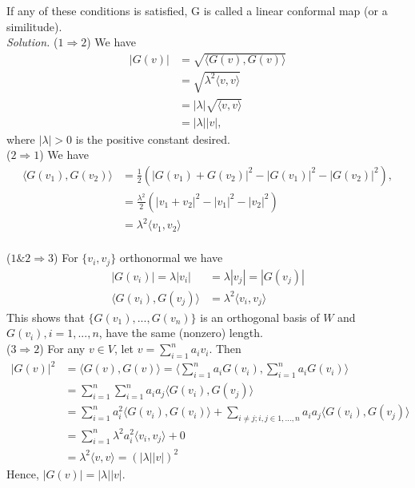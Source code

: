 \documentclass[12pt]{article}
\begin{document}
If any of these conditions is satisfied, G is called a linear conformal map (or a similitude).\\

\textit{Solution.}
($1 \Rightarrow 2$) We have \begin{align*}
    |G(v)| &= \sqrt{\langle G(v), G(v)\rangle}\\
    &= \sqrt{\lambda^2 \langle v, v\rangle}\\
    &= |\lambda|\sqrt{\langle v, v\rangle}\\
    &= |\lambda||v|,
\end{align*}
where $|\lambda| > 0$ is the positive constant desired.\\

($2 \Rightarrow 1$) We have \begin{align*}
    \langle G(v_1), G(v_2)\rangle &= \frac{1}{2}(|G(v_1)+G(v_2)|^2-|G(v_1)|^2-|G(v_2)|^2),\\
    &= \frac{\lambda^2}{2}(|v_1+v_2|^2-|v_1|^2-|v_2|^2)\\
    &= \lambda^2\langle v_1, v_2\rangle\\
\end{align*}

($1\&2 \Rightarrow 3$) For $\{v_i,v_j\}$ orthonormal we have \begin{align*}
    |G(v_i)| = \lambda|v_i| &= \lambda|v_j| = |G(v_j)|\\
    \langle G(v_i), G(v_j)\rangle &= \lambda^2 \langle v_i, v_j\rangle
\end{align*}
This shows that $\{G(v_1),...,G(v_n)\}$ is an orthogonal basis of $W$ and $G(v_i), i = 1, ...,n$, have the same (nonzero) length.\\

($3 \Rightarrow 2$) For any $v \in V$, let $v = \sum_{i=1}^na_iv_i$. Then \begin{align*}
    |G(v)|^2 &= \langle G(v),G(v)\rangle = \langle \sum_{i=1}^n a_iG(v_i),\sum_{i=1}^n a_iG(v_i)\rangle\\
    &=\sum_{i=1}^n\sum_{i=1}^n a_ia_j\langle G(v_i),G(v_j)\rangle\\
    &=\sum_{i=1}^n a_i^2\langle G(v_i),G(v_i)\rangle + \sum_{i\neq j; i,j\in{1,\dots, n}}a_ia_j\langle G(v_i),G(v_j)\rangle\\
    &=\sum_{i=1}^n \lambda^2 a_i^2\langle v_i, v_j\rangle + 0\\
    &=\lambda^2 \langle v,v\rangle = (|\lambda||v|)^2
\end{align*}
Hence, $|G(v)| = |\lambda||v|$.
\end{document}
